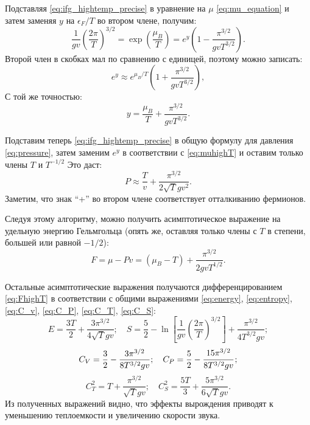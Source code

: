 Подставляя \eqref{eq:ifg_hightemp_precise} в уравнение на $\mu$ \eqref{eq:mu_equation} и затем заменяя $y$ на $\epsilon_F / T$ во втором члене, получим:
\begin{equation}
    \label{eq:mu_equation_high_T}
    \frac{1}{gv}\left( \frac{2\pi}{T} \right)^{3/2}
    = \exp\left(\frac{\mu_B}{T}\right)
    = e^y\left( 1 - \frac{\pi^{3/2}}{gvT^{3/2}} \right).
\end{equation}
Второй член в скобках мал по сравнению с единицей, поэтому можно записать:
\begin{equation}
    \label{eq:muhighT}
    e^y \approx e^{\mu_B / T}\left( 1 + \frac{\pi^{3/2}}{gvT^{3/2}} \right),
\end{equation}
С той же точностью:
\begin{equation*}
  y = \frac{\mu_B}{T} + \frac{\pi^{3/2}}{gvT^{3/2}}.
\end{equation*}

Подставим теперь \eqref{eq:ifg_hightemp_precise} в общую формулу для давления \eqref{eq:pressure}, затем заменим $e^{y}$ в соответствии с \eqref{eq:muhighT} и оставим только члены $T$ и $T^{-1 / 2}$
Это даст:
\begin{equation}
    \label{eq:p_ht}
    P \approx \frac{T}{v} + \frac{\pi^{3/2}}{2\sqrt{T}gv^2}.
\end{equation}
Заметим, что знак ``+'' во втором члене соответствует отталкиванию фермионов.

Следуя этому алгоритму, можно получить асимптотическое выражение на удельную энергию Гельмгольца (опять же, оставляя только члены с $T$ в степени, большей или равной $-1 / 2$):
\begin{equation}
    \label{eq:FhighT}
    F = \mu - Pv
    = (\mu_B - T) + \frac{\pi^{3/2}}{2gvT^{1/2}}.
\end{equation}

Остальные асимптотические выражения получаются дифференцированием \eqref{eq:FhighT} в соответствии с общими выражениями \eqref{eq:energy}, \eqref{eq:entropy}, \eqref{eq:C_v}, \eqref{eq:C_P}, \eqref{eq:C_T}, \eqref{eq:C_S}:
\begin{equation}
    \label{eq:EShighT}
    E = \frac{3T}{2} + \frac{3\pi^{3/2}}{4\sqrt{T}gv};\quad S
    = \frac{5}{2} - \ln\left[ \frac{1}{gv}\left( \frac{2\pi}{T} \right)^{3/2} \right] + \frac{\pi^{3/2}}{4T^{3/2}gv};
\end{equation}
\begin{equation}
    \label{eq:CVCPhighT}
    C_V = \frac{3}{2} - \frac{3\pi^{3/2}}{8T^{3/2}gv};\quad
    C_P = \frac{5}{2} - \cfrac{15 \pi^{3 / 2}}{8 T^{3 / 2} g v}\, ;
\end{equation}
\begin{equation}
    \label{eq:CTCShighT}
    C_T^2 = T + \frac{\pi^{3/2}}{\sqrt{T}gv};\quad
    C_S^2 = \frac{5 T}{3} + \frac{5 \pi^{3/2}}{6 \sqrt{T}gv} .
\end{equation}
Из полученных выражений видно, что эффекты вырождения приводят к уменьшению теплоемкости и увеличению скорости звука.

